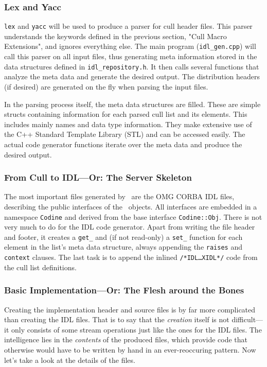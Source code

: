 \subsubsection{Lex and Yacc}
\texttt{lex} and \texttt{yacc} will be used to produce a parser for cull
header files. This parser understands the keywords defined in the previous
section, "Cull Macro Extensions", and ignores everything else. The main
program (\texttt{idl\_gen.cpp}) will call this parser on all input files,
thus generating meta information stored in the data structures defined in
\texttt{idl\_repository.h}. It then calls several functions
that analyze the meta data and generate the desired
output. The distribution headers (if desired) are generated on the fly when
parsing the input files.

In the parsing process itself, the meta data structures are filled. These are
simple structs containing information for each parsed cull list and its
elements. This includes mainly names and data type information. They make
extensive use of the C++ Standard Template Library (STL) and can be accessed
easily. The actual code generator functions iterate over the meta data and
produce the desired output.

\subsubsection[From Cull to IDL]{\label{s_prog_skeleton}
                             From Cull to IDL---Or: The Server Skeleton}
The most important files generated by \idlgen\ are the OMG CORBA IDL files,
describing the public interfaces of the \codine\ objects. All interfaces are
embedded in a namespace \texttt{Codine} and derived from the base interface
\texttt{Codine::Obj}. There is not very much to do for the IDL code
generator. Apart from writing the file header and footer, it creates a
\texttt{get\_} and (if not read-only) a \texttt{set\_} function for each
element in the list's meta data structure, always appending the
\texttt{raises} and \texttt{context} clauses. The last task is to append the
inlined \texttt{/*IDL\dots XIDL*/} code from the cull list definitions.

\subsubsection[Basic Implementation]{\label{s_prog_flesh}
                     Basic Implementation---Or: The Flesh around the Bones}
Creating the implementation header and source files is by far more complicated
than creating the IDL files. That is to say that the \emph{creation}
itself is not difficult---it only consists of some stream operations just like 
the ones for the IDL files. The intelligence lies in the \emph{contents} of
the produced files, which provide code that otherwise would have to be written 
by hand in an ever-reoccuring pattern. Now let's take a look at the details of 
the files.

